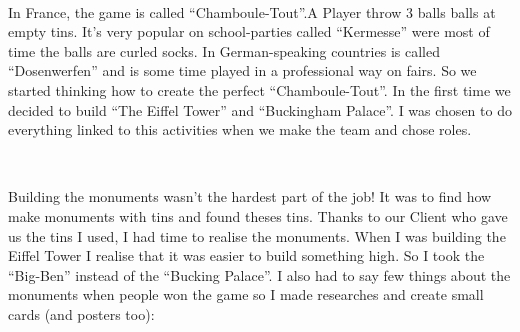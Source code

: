 \documentclass[11pt;a4paper]{report}
\begin{document}
~

    In France, the game is called “Chamboule-Tout”.A Player throw 3 balls balls at empty tins. It’s very popular on school-parties called “Kermesse” were most of time the balls are curled socks. In German-speaking countries is called “Dosenwerfen” and is some time played in a professional way on fairs. So we started thinking how to create the perfect “Chamboule-Tout”. In the first time we decided to build “The Eiffel Tower” and “Buckingham Palace”. I was chosen to do everything linked to this activities when we make the team and chose roles.

~

    Building the monuments wasn’t the hardest part of the job! It was to find how make monuments with tins and found theses tins. Thanks to our Client who gave us the tins I used, I had time to realise the monuments. When I was building the Eiffel Tower I realise that it was easier to build something high. So I took the “Big-Ben” instead of the “Bucking Palace”. I also had to say few things about the monuments when people won the game so I made researches and create small cards (and posters too):
\end{document}
